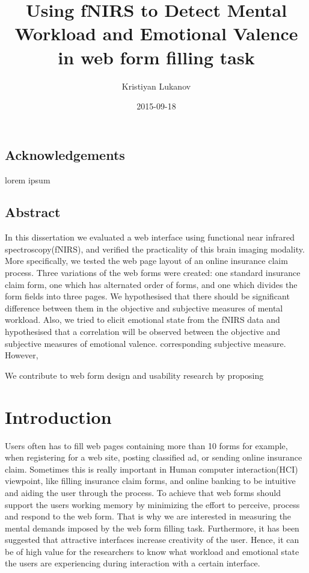 \documentclass[a4paper]{report}
\title{Using fNIRS to Detect Mental Workload and Emotional Valence in web form filling task}%
\date{2015-09-18}
\author{Kristiyan Lukanov}
\begin{document}
\maketitle
\newpage
{}

\section*{Acknowledgements}
lorem ipsum 
\newpage
\section*{Abstract}
In this dissertation we evaluated a web interface using functional near infrared spectroscopy(fNIRS), and verified the practicality of this brain imaging modality. More specifically, we tested the web page layout of an online insurance claim process. Three variations of the web forms were created: one standard insurance claim form, one which has alternated order of forms, and one which divides the form fields into three pages. We hypothesised that there should be significant difference between them in the objective and subjective measures of mental workload. Also, we tried to elicit emotional state from the fNIRS data and hypothesised that a correlation will be observed between the objective and subjective measures of emotional valence. corresponding subjective measure. However,


We contribute to web form design and usability research by proposing

\newpage
\tableofcontents
\newpage
	
\chapter{Introduction}

	Users often has to fill web pages containing more than 10 forms for example, when registering for a web site, posting classified ad, or sending online insurance claim. Sometimes this is really important in Human computer interaction(HCI) viewpoint, like filling insurance claim forms, and online banking to be intuitive and aiding the user through the process. To achieve that web forms should support the users working memory\cite{nielsen1990heuristic,shneiderman1992designing} by minimizing the effort to perceive, process and respond to the web form. That is why we are interested in measuring the mental demands imposed by the web form filling task. Furthermore, it has been suggested that attractive interfaces increase creativity\cite{norman2002emotion} of the user. Hence, it can be of high value for the researchers to know what workload and emotional state the users are experiencing during interaction with a certain interface.
	
\end{document}
